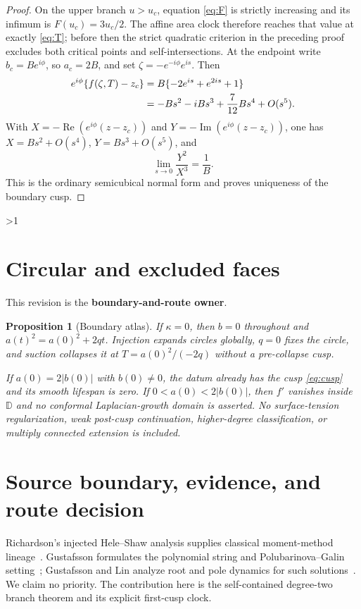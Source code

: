 \documentclass[10pt]{article}
\providecommand{\CRevisionRound}{2}
\newtheorem{proposition}{Proposition}
\newcommand{\D}{\mathbb D}
\newcommand{\Real}{\operatorname{Re}}
\begin{document}
\begin{proof}
On the upper branch $u>u_c$, equation \eqref{eq:F} is strictly increasing
and its infimum is $F(u_c)=3u_c/2$.  The affine area clock therefore reaches
that value at exactly \eqref{eq:T}; before then the strict quadratic
criterion in the preceding proof excludes both critical points and
self-intersections.  At the endpoint write $b_c=Be^{i\phi}$, so
$a_c=2B$, and set $\zeta=-e^{-i\phi}e^{is}$.  Then
\begin{align}\label{eq:cusp}
 e^{i\phi}\{f(\zeta,T)-z_c\}
 &=B\{-2e^{is}+e^{2is}+1\}\\
 &=-Bs^2-iBs^3+\frac7{12}Bs^4+O(s^5).\notag
\end{align}
With $X=-\Real(e^{i\phi}(z-z_c))$ and
$Y=-\operatorname{Im}(e^{i\phi}(z-z_c))$, one has
$X=Bs^2+O(s^4)$, $Y=Bs^3+O(s^5)$, and
\begin{equation}\label{eq:semi}
 \lim_{s\to0}\frac{Y^2}{X^3}=\frac1B.
\end{equation}
This is the ordinary semicubical normal form and proves uniqueness of the
boundary cusp.
\end{proof}
\fi

\ifnum\CRevisionRound>1
\section{Circular and excluded faces}
This revision is the \textbf{boundary-and-route owner}.

\begin{proposition}[Boundary atlas]\label{prop:boundary}
If $\kappa=0$, then $b=0$ throughout and
$a(t)^2=a(0)^2+2qt$.  Injection expands circles globally, $q=0$ fixes the
circle, and suction collapses it at
$T=a(0)^2/(-2q)$ without a pre-collapse cusp.

If $a(0)=2|b(0)|$ with $b(0)\ne0$, the datum already has the cusp
\eqref{eq:cusp} and its smooth lifespan is zero.  If
$0<a(0)<2|b(0)|$, then $f'$ vanishes inside $\D$ and no conformal
Laplacian-growth domain is asserted.  No surface-tension regularization,
weak post-cusp continuation, higher-degree classification, or multiply
connected extension is included.
\end{proposition}

\section{Source boundary, evidence, and route decision}
Richardson's injected Hele--Shaw analysis supplies classical moment-method
lineage~\cite{Richardson}.  Gustafsson formulates the polynomial string and
Polubarinova--Galin setting~\cite{Gustafsson}; Gustafsson and Lin analyze
root and pole dynamics for such solutions~\cite{GL}.  We claim no priority.
The contribution here is the self-contained degree-two branch theorem and
its explicit first-cusp clock.
\end{document}
